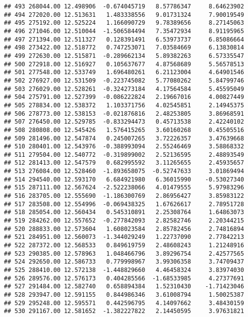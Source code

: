 \documentclass[
]{article}
\begin{document}
\begin{verbatim}
## 493 268044.00 12.498906  -0.674045719   8.57786347     8.64623902
## 494 272020.00 12.513631   1.483338556   9.01731324     7.90019549
## 495 275192.00 12.525224   1.166090729   9.78389656     8.27145063
## 496 271046.00 12.510044  -1.506584494   7.35472934     8.91195965
## 497 271394.00 12.511327   0.128391491   6.53973737     6.85086664
## 498 273422.00 12.518772   0.747253071   7.03584669     6.13830814
## 499 272630.00 12.515871  -0.289662134   5.89382263     6.57335547
## 500 272918.00 12.516927   0.105637677   4.87568689     5.56578513
## 501 277548.00 12.533749   1.696480261   6.21123004     4.64901546
## 502 276927.00 12.531509  -0.223745082   5.77080262     5.84799746
## 503 276029.00 12.528261  -0.324273184   4.17564584     5.45595049
## 504 275791.00 12.527399  -0.086222824   2.19667016     4.00827449
## 505 278834.00 12.538372   1.103371756   4.02545851     2.14945375
## 506 278773.00 12.538153  -0.021876816   2.48253805     3.86968591
## 507 276450.00 12.529785  -0.833294473   0.45713538     2.42240102
## 508 280808.00 12.545426   1.576415265   3.60160268     0.45505516
## 509 281496.00 12.547874   0.245007265   3.72226357     3.47639668
## 510 280401.00 12.543976  -0.388993094   2.55246469     3.58868332
## 511 279504.00 12.540772  -0.319899002   2.52136595     2.48893549
## 512 281413.00 12.547579   0.682995592   3.11265655     2.45935657
## 513 276084.00 12.528460  -1.893658075  -0.52747633     3.01869494
## 514 294540.00 12.593170   6.684921980   6.36015990    -0.53027340
## 515 287111.00 12.567624  -2.522238066   4.01479555     5.97983296
## 516 283705.00 12.555690  -1.186300769   2.86956427     3.85983122
## 517 283508.00 12.554996  -0.069438325   1.67626617     2.78951728
## 518 285054.00 12.560434   0.545310891   2.25308764     1.64863073
## 519 284262.00 12.557652  -0.277842093   2.82582746     2.20344215
## 520 288833.00 12.573604   1.608023584   2.85782456     2.74816894
## 521 284951.00 12.560073  -1.344029249   1.22737090     2.77842213
## 522 287372.00 12.568533   0.849619759   2.48608243     1.21248916
## 523 290385.00 12.578963   1.048466796   3.89296754     2.42577565
## 524 292650.00 12.586733   0.779998967   3.99306358     3.74709437
## 525 288410.00 12.572138  -1.448829660   4.46458324     3.83974030
## 526 289576.00 12.576173   0.404285566  -1.68533985     4.27377691
## 527 291484.00 12.582740   0.658894384   1.52310430    -1.71423046
## 528 293947.00 12.591155   0.844986346   3.61008794     1.50025387
## 529 295248.00 12.595571   0.442596795   4.14097662     3.48430159
## 530 291167.00 12.581652  -1.382227822   2.14450595     3.97631821

\end{verbatim}
\end{document}
